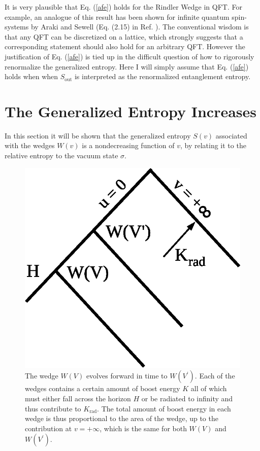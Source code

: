\documentclass[12pt]{article}
\begin{document}
It is very plausible that Eq. (\ref{afe}) holds for the Rindler Wedge in QFT.  For example, an analogue of this result has been shown for infinite quantum spin-systems by Araki and Sewell (Eq. (2.15) in Ref. \cite{AS77}).  The conventional wisdom is that any QFT can be discretized on a lattice, which strongly suggests that a corresponding statement should also hold for an arbitrary QFT.  However the justification of Eq. (\ref{afe}) is tied up in the difficult question of how to rigorously renormalize the generalized entropy.  Here I will simply assume that Eq. (\ref{afe}) holds when when $S_\mathrm{out}$ is interpreted as the renormalized entanglement entropy.

\section{The Generalized Entropy Increases}\label{form}

In this section it will be shown that the generalized entropy $S(v)$ associated with the wedges $W(v)$ is a nondecreasing function of $v$, by relating it to the relative entropy to the vacuum state $\sigma$.

\begin{figure}[ht]
\centering
\includegraphics[width=.75\textwidth]{increase.eps}
\caption{\footnotesize The wedge $W(V)$ evolves forward in time to $W(V^\prime)$.  Each of the wedges contains a certain amount of boost energy $K$ all of which must either fall across the horizon $H$ or be radiated to infinity and thus contribute to $K_\mathrm{rad}$.  The total amount of boost energy in each wedge is thus proportional to the area of the wedge, up to the contribution at $v = +\infty$, which is the same for both $W(V)$ and $W(V^\prime)$.} \label{increase}
\end{figure}
\end{document}
